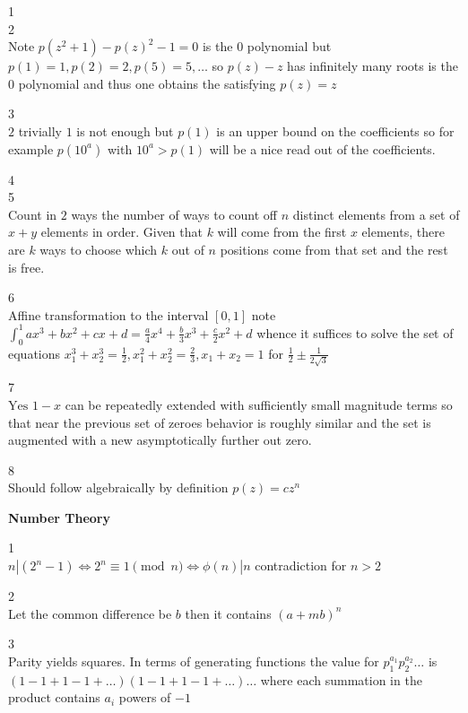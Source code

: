1 \\


2 \\
Note $p(z^2+1)-p(z)^2-1=0$ is the $0$ polynomial but $p(1)=1,p(2)=2,p(5)=5,\dots$ so $p(z)-z$ has infinitely many roots is the $0$ polynomial and thus one obtains the satisfying $\boxed{p(z)=z}$

3 \\
$\boxed{2}$ trivially $1$ is not enough but $p(1)$ is an upper bound on the coefficients so for example $p(10^a)$ with $10^a>p(1)$ will be a nice read out of the coefficients.

4 \\


5 \\
Count in $2$ ways the number of ways to count off $n$ distinct elements from a set of $x+y$ elements in order. Given that $k$ will come from the first $x$ elements, there are $k$ ways to choose which $k$ out of $n$ positions come from that set and the rest is free.

6 \\
Affine transformation to the interval $[0,1]$ note $\int_0^1 ax^3+bx^2+cx+d=\frac{a}{4}x^4+\frac{b}{3}x^3+\frac{c}{2}x^2+d$ whence it suffices to solve the set of equations $x_1^3+x_2^3=\frac{1}{2},x_1^2+x_2^2=\frac{2}{3},x_1+x_2=1$ for $\frac{1}{2}\pm \frac{1}{2\sqrt{3}}$

7 \\
$\boxed{\text{Yes}}$ $1-x$ can be repeatedly extended with sufficiently small magnitude terms so that near the previous set of zeroes behavior is roughly similar and the set is augmented with a new asymptotically further out zero.

8 \\
Should follow algebraically by definition $p(z)=cz^n$

\newpage

\textbf{Number Theory}

1 \\
$n|(2^n-1) \iff 2^n \equiv 1 \pmod{n} \iff \phi(n)|n$ contradiction for $n>2$

2 \\
Let the common difference be $b$ then it contains $(a+mb)^n$

3 \\
Parity yields squares. In terms of generating functions the value for $p_1^{a_1}p_2^{a_2}\dots$ is $(1-1+1-1+\dots)(1-1+1-1+\dots)\dots$ where each summation in the product contains $a_i$ powers of $-1$

